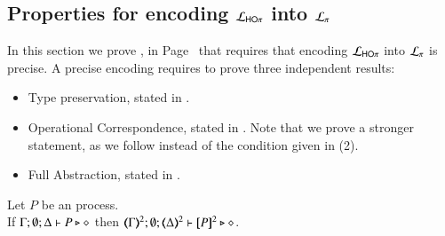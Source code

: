 

\subsection{Properties for encoding $\mathcal{L}_{\mathsf{HO}\pi}$ into $\mathcal{L}_{\pi}$}
\label{app:enc:HOp_to_sessp}

In this section we prove , in Page~\pageref{f:enc:hotopi}
that requires that encoding
$\mathcal{L}_{\mathsf{HO}\pi}$ into $\mathcal{L}_{\pi}$ is precise.
A precise encoding requires to prove three independent results:
\begin{itemize}
	\item	Type preservation, stated in .
	\item	Operational Correspondence, stated in .
		Note that we prove a stronger statement,
		as we follow 		
		instead of the condition given in (2).
	\item	Full Abstraction, stated in .
\end{itemize}


\begin{proposition}\rm
	\label{app:prop:typepres_HOp_to_p}
	Let $P$ be an \HOp process. \\
	If $\Gamma; \emptyset; \Delta \vdash P \triangleright \diamond$ then 
	$\mapt{\Gamma}^{2}; \emptyset; \mapt{\Delta}^{2} \proves \map{P}^{2} \hastype \Proc$.
\end{proposition}



